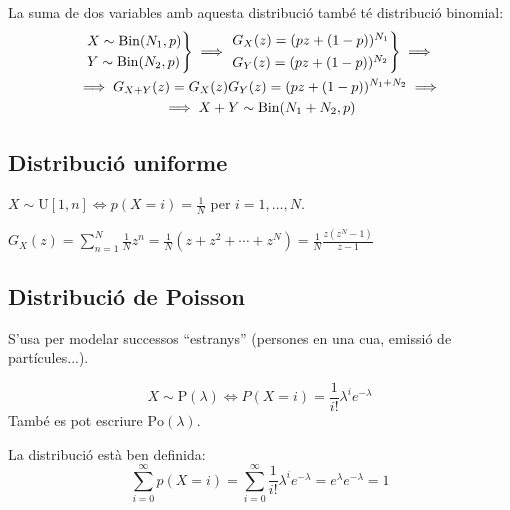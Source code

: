 \begin{obs} La suma de dos variables amb aquesta distribució també té distribució binomial:
    \begin{gather*}
    \begin{rcases*} X \sim \mathrm{Bin}(N_1,p) \\ Y \sim \mathrm{Bin}(N_2,p) \end{rcases*} \implies
    \begin{rcases*} G_X(z) = (pz+(1-p))^{N_1} \\ G_Y(z) = (pz+(1-p))^{N_2} \end{rcases*}
    \implies \\
    \implies G_{X+Y}(z) = G_X(z)G_Y(z) = (pz+(1-p))^{N_1+N_2} \implies \\
    \implies X+Y \sim \mathrm{Bin}(N_1+N_2,p)
    \end{gather*}
\end{obs}

\subsection*{Distribució uniforme}

\begin{defi}
    $X \sim \mathrm{U}[1,n] \iff p(X=i)=\frac{1}{N}$ per $i = 1,\dots,N$.
\end{defi}

\begin{prop}
    $G_X(z) = \sum_{n=1}^N \frac{1}{N}z^n = \frac{1}{N}(z+z^2+\cdots+z^N) = \frac{1}{N}\frac{z(z^N-1)}{z-1}$
\end{prop}

\subsection*{Distribució de Poisson}

S'usa per modelar successos ``estranys'' (persones en una cua, emissió de partícules...).

\begin{defi}
    \[X \sim \mathrm{P}(\lambda) \iff P(X=i) = \frac{1}{i!}\lambda^i e^{-\lambda}\]
    També es pot escriure $\mathrm{Po}(\lambda)$.
\end{defi}

\begin{obs}
    La distribució està ben definida:
    \[\sum_{i=0}^\infty p(X=i) = \sum_{i=0}^\infty \frac{1}{i!}\lambda^i e^{-\lambda} = e^\lambda e^{-\lambda} = 1\]
\end{obs}


